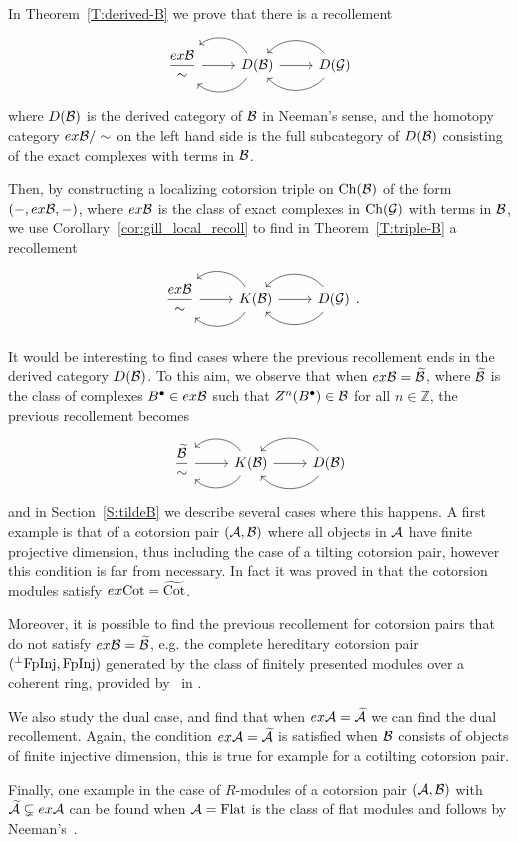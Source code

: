 In Theorem~\ref{T:derived-B} we prove that there is a recollement
\begin{equation*}
  \recdiagram{\dfrac{ex\B}{\sim}}{D(\B)}{D(\G)}
\end{equation*}
where $D(\mathcal{B})$ is the derived category of $\mathcal{B}$ in Neeman's sense, and the homotopy category $ex\mathcal{B}/\sim$ on the left hand side is the full subcategory of $D(\mathcal{B})$ consisting of the exact complexes with terms in $\mathcal{B}$.

Then, by constructing a localizing cotorsion triple on $\mathrm{Ch}(\mathcal{B})$ of the form $(-,ex\mathcal{B},-)$, where $ex\mathcal{B}$ is the class of exact complexes in $\mathrm{Ch}(\mathcal{G})$ with terms in $\mathcal{B}$, we use Corollary~\ref{cor:gill_local_recoll} to find in Theorem~\ref{T:triple-B} a recollement
\begin{equation*}
  \recdiagram{\dfrac{ex\B}{\sim}}{K(\B)}{D(\G)}.
\end{equation*}

It would be interesting to find cases where the previous recollement ends in the derived category $D(\mathcal{B})$. To this aim, we observe that when $ex\mathcal{B}=\widetilde{\mathcal{B}}$, where $\widetilde{\mathcal{B}}$ is the class of complexes $B^\bullet\in ex\mathcal{B}$ such that $Z^n(B^\bullet)\in\mathcal{B}$ for all $n\in\mathbb{Z}$,  the previous recollement becomes
\begin{equation*}
  \recdiagram{\dfrac{\wac{\B}}{\sim}}{K(\B)}{D(\B)}
\end{equation*}
and in Section~\ref{S:tildeB} we describe several cases where this happens. A first example is that of a cotorsion pair $(\mathcal{A},\mathcal{B})$ where all objects in $\mathcal{A}$ have finite projective dimension, thus including the case of a tilting cotorsion pair, however this condition is far from necessary. In fact it was proved in \cite{BCIE} that the cotorsion modules satisfy $ex\mathrm{Cot}=\widetilde{\mathrm{Cot}}$.

Moreover, it is possible to find the previous recollement for cotorsion pairs that do not satisfy $ex\mathcal{B}=\widetilde{\mathcal{B}}$, e.g. the complete hereditary cotorsion pair $(^\perp\mathrm{FpInj},\mathrm{FpInj})$ generated by the class of finitely presented modules over a coherent ring, provided by \sto\  in \cite{Stopurity}.

We also study the dual case, and find that when $ex\mathcal{A}=\widetilde{\mathcal{A}}$ we can find the dual recollement. Again, the condition $ex\mathcal{A}=\widetilde{\mathcal{A}}$ is satisfied when $\mathcal{B}$ consists of objects of finite injective dimension, this is true for example for a cotilting cotorsion pair.

Finally, one example in the case of $R$-modules of a cotorsion pair $(\mathcal{A},\mathcal{B})$ with $\widetilde{\mathcal{A}}\subsetneq ex\mathcal{A}$ can be found when $\mathcal{A}=\mathrm{Flat}$ is the class of flat modules and follows by Neeman's~\cite{Nee08}.

